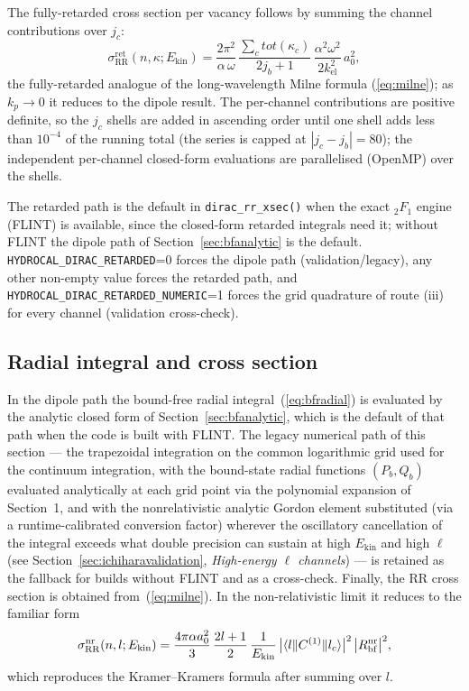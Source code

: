 \documentclass[11pt,a4paper]{article}
\begin{document}
The fully-retarded cross section per vacancy follows by summing the
channel contributions over $j_{c}$:
\begin{equation}
  \sigma_{\mathrm{RR}}^{\mathrm{ret}}(n,\kappa;E_{\mathrm{kin}})
  = \frac{2\pi^{2}}{\alpha\,\omega}\,
    \frac{\sum_{c}\mathit{tot}(\kappa_{c})}{2j_{b}+1}\,
    \frac{\alpha^{2}\omega^{2}}{2k_{\mathrm{el}}^{2}}\,a_{0}^{2},
  \label{eq:bfret_sigma}
\end{equation}
the fully-retarded analogue of the long-wavelength Milne formula
(\ref{eq:milne}); as $k_{p}\to0$ it reduces to the dipole result.  The
per-channel contributions are positive definite, so the $j_{c}$ shells
are added in ascending order until one shell adds less than $10^{-4}$ of
the running total (the series is capped at $|j_{c}-j_{b}|=80$); the
independent per-channel closed-form evaluations are parallelised
(OpenMP) over the shells.

The retarded path is the default in {\tt dirac\_rr\_xsec()} when the
exact ${}_{2}F_{1}$ engine (FLINT) is available, since the closed-form
retarded integrals need it; without FLINT the dipole path of
Section~\ref{sec:bfanalytic} is the default.  {\tt HYDROCAL\_DIRAC\_RETARDED}=0
forces the dipole path (validation/legacy), any other non-empty value
forces the retarded path, and {\tt HYDROCAL\_DIRAC\_RETARDED\_NUMERIC}=1
forces the grid quadrature of route (iii) for every channel (validation
cross-check).

\subsection{Radial integral and cross section}

In the dipole path the bound-free radial integral~(\ref{eq:bfradial}) is
evaluated by the analytic closed form of Section~\ref{sec:bfanalytic},
which is the default of that path when the code is built with FLINT.
The legacy numerical path of this section --- the trapezoidal
integration on the common logarithmic grid used for the continuum
integration, with the bound-state radial functions $(P_{b},Q_{b})$
evaluated analytically at each grid point via the polynomial expansion
of Section~1, and with the nonrelativistic analytic Gordon element
substituted (via a runtime-calibrated conversion factor) wherever the
oscillatory cancellation of the integral exceeds what double precision
can sustain at high $E_{\mathrm{kin}}$ and high $\ell$ (see
Section~\ref{sec:ichiharavalidation}, \emph{High-energy $\ell$
channels}) --- is retained as the fallback for builds without FLINT and
as a cross-check.  Finally, the RR cross section is obtained
from~(\ref{eq:milne}).
In the non-relativistic limit it reduces to the familiar form
\begin{equation}
  \sigma_{\mathrm{RR}}^{\mathrm{nr}}(n,l; E_{\mathrm{kin}})
  = \frac{4\pi\alpha a_{0}^{2}}{3}\,
    \frac{2l+1}{2}\,
    \frac{1}{E_{\mathrm{kin}}}\,
    \bigl|\braket{l\|C^{(1)}\|l_{c}}\bigr|^{2}\,
    \bigl|R_{\mathrm{bf}}^{\mathrm{nr}}\bigr|^{2},
\end{equation}
which reproduces the Kramer--Kramers formula after summing over $l$.
\end{document}
